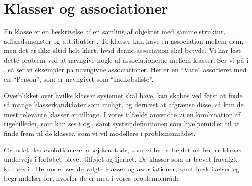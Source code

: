 \section{Klasser og associationer}
\label{sec:klasser}

En klasse er en beskrivelse af en samling af objekter med samme struktur, adfærdsmønster og attributter \cite[s. ~51]{ooad}. To klasser kan have en association mellem dem, men det er ikke altid helt klart, hvad denne association skal betyde. Vi har løst dette problem ved at navngive nogle af associationerne mellem klasser. Ser vi på  i , så ser vi eksempler på navngivne associationer. Her er en ``Vare'' associeret med en ``Person'', som er navngivet som ``Indkøbsliste''. 

Overblikket over hvilke klasser systemet skal have, kan skabes ved først at finde så mange klasserkandidater som muligt, og dernæst at afgrænse disse, så kun de mest relevante klasser er tilbage. I vores tilfælde anvendte vi en kombination af rigebilleder, som kan ses i  og , samt systemdefinitionen som hjælpemidler til at finde frem til de klasser, som vi vil modellere i problemområdet.

Grundet den evolutionære arbejdsmetode, som vi har arbejdet ud fra, er klasser undervejs i forløbet blevet tilføjet og fjernet. De klasser som er blevet fravalgt, kan ses i . Herunder ses de valgte klasser og associationer, samt beskrivelser og begrundelser for, hvorfor de er med i vores problemområde.

